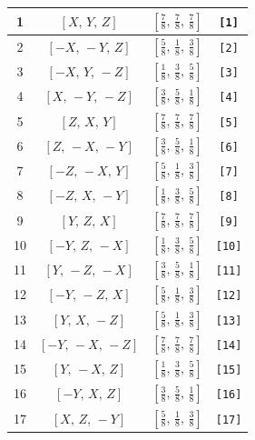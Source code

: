 \documentclass[fleqn,8pt]{jsarticle}
\begin{document}
\begin{longtable}{cccc}
1 & $\left[ X,\, Y,\, Z \right]$ & $\left[ \frac{7}{8},\, \frac{7}{8},\, \frac{7}{8} \right]$ & {\tt [1]} \\ \hline
2 & $\left[ - X,\, - Y,\, Z \right]$ & $\left[ \frac{5}{8},\, \frac{1}{8},\, \frac{3}{8} \right]$ & {\tt [2]} \\ \hline
3 & $\left[ - X,\, Y,\, - Z \right]$ & $\left[ \frac{1}{8},\, \frac{3}{8},\, \frac{5}{8} \right]$ & {\tt [3]} \\ \hline
4 & $\left[ X,\, - Y,\, - Z \right]$ & $\left[ \frac{3}{8},\, \frac{5}{8},\, \frac{1}{8} \right]$ & {\tt [4]} \\ \hline
5 & $\left[ Z,\, X,\, Y \right]$ & $\left[ \frac{7}{8},\, \frac{7}{8},\, \frac{7}{8} \right]$ & {\tt [5]} \\ \hline
6 & $\left[ Z,\, - X,\, - Y \right]$ & $\left[ \frac{3}{8},\, \frac{5}{8},\, \frac{1}{8} \right]$ & {\tt [6]} \\ \hline
7 & $\left[ - Z,\, - X,\, Y \right]$ & $\left[ \frac{5}{8},\, \frac{1}{8},\, \frac{3}{8} \right]$ & {\tt [7]} \\ \hline
8 & $\left[ - Z,\, X,\, - Y \right]$ & $\left[ \frac{1}{8},\, \frac{3}{8},\, \frac{5}{8} \right]$ & {\tt [8]} \\ \hline
9 & $\left[ Y,\, Z,\, X \right]$ & $\left[ \frac{7}{8},\, \frac{7}{8},\, \frac{7}{8} \right]$ & {\tt [9]} \\ \hline
10 & $\left[ - Y,\, Z,\, - X \right]$ & $\left[ \frac{1}{8},\, \frac{3}{8},\, \frac{5}{8} \right]$ & {\tt [10]} \\ \hline
11 & $\left[ Y,\, - Z,\, - X \right]$ & $\left[ \frac{3}{8},\, \frac{5}{8},\, \frac{1}{8} \right]$ & {\tt [11]} \\ \hline
12 & $\left[ - Y,\, - Z,\, X \right]$ & $\left[ \frac{5}{8},\, \frac{1}{8},\, \frac{3}{8} \right]$ & {\tt [12]} \\ \hline
13 & $\left[ Y,\, X,\, - Z \right]$ & $\left[ \frac{5}{8},\, \frac{1}{8},\, \frac{3}{8} \right]$ & {\tt [13]} \\ \hline
14 & $\left[ - Y,\, - X,\, - Z \right]$ & $\left[ \frac{7}{8},\, \frac{7}{8},\, \frac{7}{8} \right]$ & {\tt [14]} \\ \hline
15 & $\left[ Y,\, - X,\, Z \right]$ & $\left[ \frac{1}{8},\, \frac{3}{8},\, \frac{5}{8} \right]$ & {\tt [15]} \\ \hline
16 & $\left[ - Y,\, X,\, Z \right]$ & $\left[ \frac{3}{8},\, \frac{5}{8},\, \frac{1}{8} \right]$ & {\tt [16]} \\ \hline
17 & $\left[ X,\, Z,\, - Y \right]$ & $\left[ \frac{5}{8},\, \frac{1}{8},\, \frac{3}{8} \right]$ & {\tt [17]} \\ \hline

\end{longtable}
\end{document}
